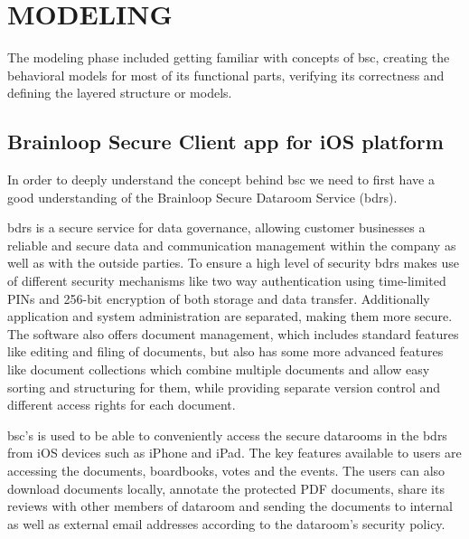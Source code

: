 \chapter{MODELING}
\label{chapter:modeling}

\par
The modeling phase included getting familiar with concepts of \acrshort{bsc}, creating the behavioral models for most of its functional parts, verifying its correctness and  defining the layered structure or models.

\section{Brainloop Secure Client app for iOS platform} 

\par
In order to deeply understand the concept behind \acrshort{bsc} we need to first have a good understanding of the Brainloop Secure Dataroom Service (\acrshort{bdrs}). 

\par
\acrshort{bdrs} \cite{BDRS_Description} is a secure service for data governance, allowing customer businesses a reliable and secure data and communication management  within the company as well as with the outside parties. To ensure a high level of security \acrshort{bdrs} makes use of different security mechanisms like two way authentication using time-limited PINs and 256-bit encryption of both storage and data transfer. Additionally application and system administration are separated, making them more secure.
The software also offers document management, which includes standard features like editing and filing of documents, but also has some more advanced features like document collections which combine multiple documents and allow easy sorting and structuring for them, while providing separate version control and different access rights for each document.

\par
\acrshort{bsc}'s \cite{BSC_UserGuide} is used to be able to conveniently access the secure datarooms in the \acrshort{bdrs} from iOS devices such as iPhone and iPad. The key features available to users are accessing the documents, boardbooks, votes and the events. The users can also download documents locally, annotate the protected PDF documents, share its reviews with other members of dataroom and sending the documents to internal as well as external email addresses according to the dataroom's security policy.

